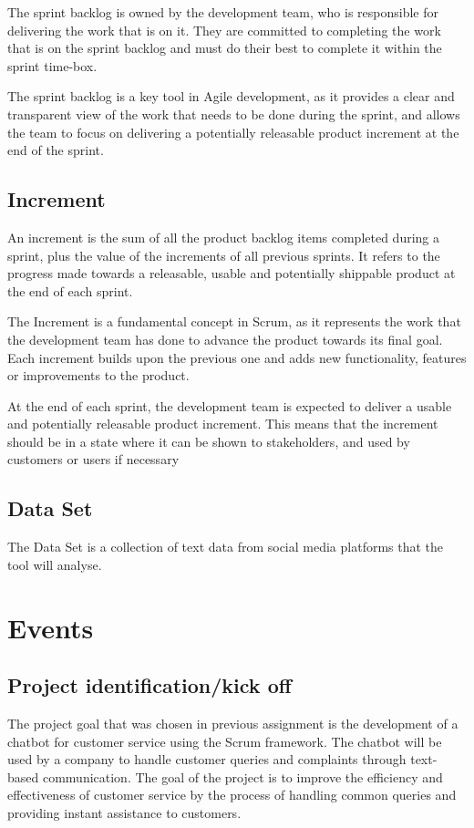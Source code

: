 \documentclass[a4paper,12pt]{article}
\begin{document}
The sprint backlog is owned by the development team, who is responsible for delivering the work that is on it. 
They are committed to completing the work that is on the sprint backlog and must do their best to complete it within the sprint time-box.

The sprint backlog is a key tool in Agile development, as it provides a clear and transparent view of the work that needs to be done during the sprint, and allows the team to focus on delivering a potentially releasable product increment at the end of the sprint.

\subsection{Increment}
An increment is the sum of all the product backlog items completed during a sprint, plus the value of the increments of all previous sprints.
It refers to the progress made towards a releasable, usable and potentially shippable product at the end of each sprint.

The Increment is a fundamental concept in Scrum, as it represents the work that the development team has done to advance the product towards its final goal.
Each increment builds upon the previous one and adds new functionality, features or improvements to the product.

At the end of each sprint, the development team is expected to deliver a usable and potentially releasable product increment. This means that the increment should be in a state where it can be shown to stakeholders, and used by customers or users if necessary

\subsection{Data Set}
The Data Set is a collection of text data from social media platforms that the tool will analyse.

\section{Events}

\subsection{Project identification/kick off}
The project goal that was chosen in previous assignment is the development of a chatbot for customer service using the Scrum framework.
The chatbot will be used by a company to handle customer queries and complaints through text-based communication.
The goal of the project is to improve the efficiency and effectiveness of customer service by  the process of handling common queries and providing instant assistance to customers.
\end{document}
